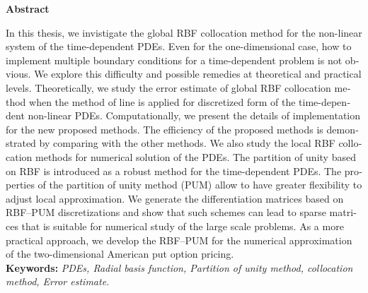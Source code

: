 %
%
%
%
\thispagestyle{empty} 	%
\begin{latin} 					%
	
	\centerline{\textbf{\large{Abstract}}}
	\vskip 1cm
	\noindent 
	In this thesis, we invistigate the global RBF collocation method
	for the non-linear system of the time-dependent PDEs. Even for the
	one-dimensional case, how to implement multiple boundary
	conditions for a time-dependent problem is not obvious. We explore
	this difficulty and possible remedies at theoretical and practical
	levels. Theoretically, we study the error estimate of global RBF
	collocation method when the method of line is applied  for
	discretized form of the time-dependent non-linear PDEs.
	Computationally, we present the details of implementation for the
	new proposed methods. The efficiency of the proposed methods is
	demonstrated by comparing with the other methods.
	We also study the local RBF collocation methods for numerical
	solution of the PDEs. The partition of unity based on RBF is
	introduced as a robust method for the time-dependent PDEs. The
	properties of the partition of unity method (PUM) allow to have
	greater flexibility to adjust local approximation. We generate the
	differentiation matrices based on RBF--PUM discretizations and
	show that such schemes can lead to sparse matrices that is
	suitable for numerical study of the large scale problems. 
	As a more practical approach, we develop the RBF--PUM
	for the numerical approximation of the two-dimensional American
	put option pricing.\\
	
	\noindent
	\textbf{Keywords:} 
	\emph{PDEs, Radial basis function, Partition of unity method, collocation method, Error estimate.}
\end{latin}